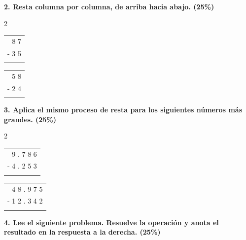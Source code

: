 \documentclass[12pt, letterpaper]{article}
\newcommand{\boxfill}[1][1.5cm]{\tcbox[on line, size=minimal, colframe=valdark!80, colback=white, boxrule=0.5pt, arc=1mm, boxsep=3pt, left=2pt, right=2pt, top=2pt, bottom=2pt]{\hspace*{#1}\vphantom{M}}}
\begin{document}
	\noindent \textbf{2. Resta columna por columna, de arriba hacia abajo. (25\%)}
	
	\vspace{0.4cm}
	\begin{multicols}{2}
		\begin{center}
			\begin{tabular}{r}
				8 7 \\
				- 3 5 \\
				\hline
				\boxfill[1.2cm]
			\end{tabular}
		\end{center}
		
		\begin{center}
			\begin{tabular}{r}
				5 8 \\
				- 2 4 \\
				\hline
				\boxfill[1.2cm]
			\end{tabular}
		\end{center}
	
	\end{multicols}
	
	\vspace{0.6cm}
	
	\noindent \textbf{3. Aplica el mismo proceso de resta para los siguientes números más grandes. (25\%)}
	
	\vspace{0.4cm}
	\begin{multicols}{2}
		\begin{center}
			\begin{tabular}{r}
				9 . 7 8 6 \\
				- 4 . 2 5 3 \\
				\hline
				\boxfill[2cm]
			\end{tabular}
		\end{center}
		
		\begin{center}
			\begin{tabular}{r}
				4 8 . 9 7 5 \\
				- 1 2 . 3 4 2 \\
				\hline
				\boxfill[2.5cm]
			\end{tabular}
		\end{center}
	\end{multicols}
	
	\vspace{0.6cm}
	\newpage
	\noindent \textbf{4. Lee el siguiente problema. Resuelve la operación y anota el resultado en la respuesta a la derecha. (25\%)}
	
\end{document}
